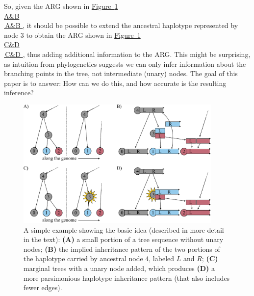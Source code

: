 \documentclass[10pt,twoside,lineno]{gsajnl}
\newcommand*{\figref}[2][]{%
	\hyperref[{#2}]{%
		Figure~\ref*{#2}%
		\ifx\\#1\\%
		\else
		\,#1%
		\fi
	}%
}
\begin{document}
So, given the ARG shown in \figref[A\&B]{fig:conceptual},
it should be possible to extend the ancestral haplotype represented by node 3
to obtain the ARG shown in \figref[C\&D]{fig:conceptual},
thus adding additional information to the ARG.
This might be surprising,
as intuition from phylogenetics suggests we can only infer
information about the branching points in the tree, not intermediate (unary) nodes.
The goal of this paper is to answer:
How can we do this, and how accurate is the resulting inference?

\begin{figure}
    \begin{center}
    \includegraphics[width=0.9\textwidth]{conceptual_figure.pdf}
    \end{center}
    \caption{
        A simple example showing the basic idea
        (described in more detail in the text):
        \textbf{(A)} a small portion of a tree sequence without unary nodes;
        \textbf{(B)} the implied inheritance pattern of the two portions of the haplotype carried by ancestral node 4,
        labeled $L$ and $R$;
        \textbf{(C)} marginal trees with a unary node added,
        which produces \textbf{(D)} a more parsimonious haplotype inheritance pattern
        (that also includes fewer edges).
        \label{fig:conceptual}
    }
\end{figure}
\end{document}
